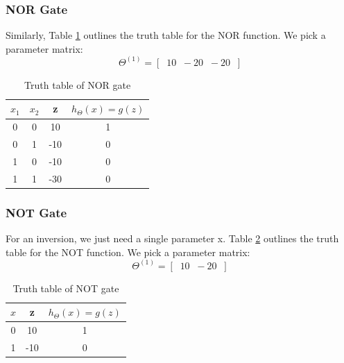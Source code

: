         \subsubsection{NOR Gate}

        Similarly, Table \ref{tab:NOR-gate} outlines the truth table for the NOR function. We pick a parameter matrix:
            \[
                \Theta^{(1)} = [\;\;10 \;\; -20 \;\; -20 \;\;]
            \] 
          

            \begin{table}
                \begin{center}
                    \begin{tabular}[htbp]{|c|c||c|c|}
                        \hline
                        $x_1$ & $x_2$ & z & $h_\Theta (x) = g(z)$ \\
                        \hline
                        \hline
                        0   &   0   &    10     &   1\\
                        0   &   1   &   -10     &   0\\
                        1   &   0   &   -10     &   0\\
                        1   &   1   &   -30     &   0\\
                        \hline
                    \end{tabular}
                \end{center}
                \caption{Truth table of NOR gate}
                \label{tab:NOR-gate}
            \end{table}


        \subsubsection{NOT Gate}

        For an inversion, we just need a single parameter x. Table \ref{tab:NOT-gate} outlines the truth table for the NOT function. We pick a parameter matrix:
            \[
                \Theta^{(1)} = [\;\;10 \;\; -20 \;\;]
            \] 
          

            \begin{table}
                \begin{center}
                    \begin{tabular}[htbp]{|c||c|c|}
                        \hline
                        $x$ & z & $h_\Theta (x) = g(z)$ \\
                        \hline
                        \hline
                        0   &    10     &   1\\
                        1   &   -10     &   0\\
                        \hline
                    \end{tabular}
                \end{center}
                \caption{Truth table of NOT gate}
                \label{tab:NOT-gate}
            \end{table}


